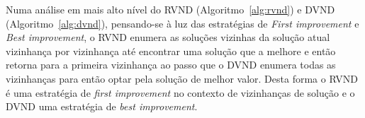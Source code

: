 Numa análise em mais alto nível do RVND (Algoritmo~\ref{alg:rvnd}) e DVND (Algoritmo~\ref{alg:dvnd}), pensando-se à luz das estratégias de \textit{First improvement} e \textit{Best improvement}, o RVND enumera as soluções vizinhas da solução atual vizinhança por vizinhança até encontrar uma solução que a melhore e então retorna para a primeira vizinhança ao passo que o DVND enumera todas as vizinhanças para então optar pela solução de melhor valor.
Desta forma o RVND é uma estratégia de \textit{first improvement} no contexto de vizinhanças de solução e o DVND uma estratégia de \textit{best improvement}.
